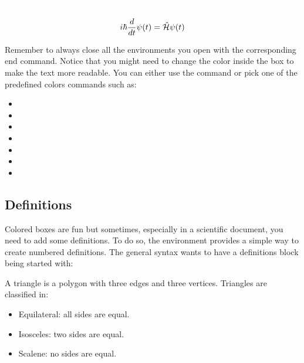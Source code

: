 \documentclass[../main.tex]{subfiles}
\begin{document}
\begin{center}
\end{center}

\begin{cbox}[orange]
	\textcolor{background}{
		This is an orange box.
		Maybe it's a little bit more colorful, so let's add a formula:
		\begin{equation*}
			i \hbar \frac{d}{dt} \psi(t) = \mathcal{\hat{H}} \psi(t)
		\end{equation*}
}
\end{cbox}

Remember to always close all the environments you open with the corresponding
end command.
Notice that you might need to change the color inside the box to make the text
more readable. You can either use the command  or pick one of the
predefined colors commands such as:

\begin{itemize}
	\item {}
	\item  {}
	\item {}
	\item {}
	\item {}
	\item {}
	\item {}
\end{itemize}

\pagebreak
\subsection{Definitions}

Colored boxes are fun but sometimes, especially in a scientific document, you
need to add some definitions. To do so, the  environment provides
a simple way to create numbered definitions. The general syntax wants to have a
definitions block being started with:

\begin{center}
\end{center}

\begin{definition}[Triangle][triangle]
    A triangle is a polygon with three edges and three vertices. Triangles are classified in:
	\begin{itemize}
		\item Equilateral: all sides are equal.
		\item Isosceles: two sides are equal.
		\item Scalene: no sides are equal.
	\end{itemize}
\end{definition}
\end{document}

